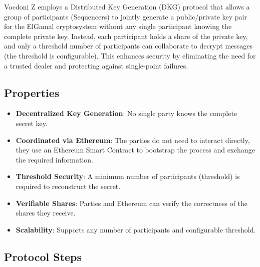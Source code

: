 
Vocdoni Z employs a Distributed Key Generation (DKG) protocol that allows a group of participants (Sequencers) to jointly generate a public/private key pair for the ElGamal cryptosystem without any single participant knowing the complete private key. Instead, each participant holds a share of the private key, and only a threshold number of participants can collaborate to decrypt messages (the threshold is configurable). This enhances security by eliminating the need for a trusted dealer and protecting against single-point failures.

\subsection{Properties}

\begin{itemize}
	\item \textbf{Decentralized Key Generation}: No single party knows the complete secret key.
	\item \textbf{Coordinated via Ethereum}: The parties do not need to interact directly, they use an Ethereum Smart Contract to bootstrap the process and exchange the required information.
	\item \textbf{Threshold Security}: A minimum number of participants (threshold) is required to reconstruct the secret.
	\item \textbf{Verifiable Shares}: Parties and Ethereum can verify the correctness of the shares they receive.
	\item \textbf{Scalability}: Supports any number of participants and configurable threshold.
\end{itemize}

\subsection{Protocol Steps}

